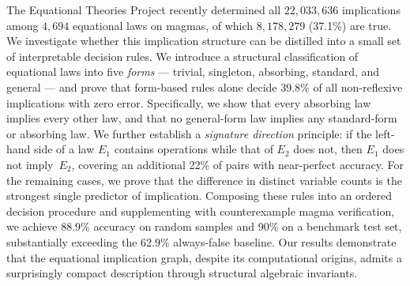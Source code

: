 The Equational Theories Project recently determined all $22{,}033{,}636$
implications among $4{,}694$ equational laws on magmas, of which $8{,}178{,}279$
(37.1\%) are true.  We investigate whether this implication structure can be
distilled into a small set of interpretable decision rules.  We introduce a
structural classification of equational laws into five \emph{forms} --- trivial,
singleton, absorbing, standard, and general --- and prove that form-based rules
alone decide 39.8\% of all non-reflexive implications with zero error.
Specifically, we show that every absorbing law implies every other law, and
that no general-form law implies any standard-form or absorbing law.  We
further establish a \emph{signature direction} principle: if the left-hand side
of a law $E_1$ contains operations while that of $E_2$ does not, then $E_1$
does not imply~$E_2$, covering an additional 22\% of pairs with near-perfect
accuracy.  For the remaining cases, we prove that the difference in distinct
variable counts is the strongest single predictor of implication.  Composing
these rules into an ordered decision procedure and supplementing with
counterexample magma verification, we achieve 88.9\% accuracy on random samples
and 90\% on a benchmark test set, substantially exceeding the 62.9\%
always-false baseline.  Our results demonstrate that the equational implication
graph, despite its computational origins, admits a surprisingly compact
description through structural algebraic invariants.
